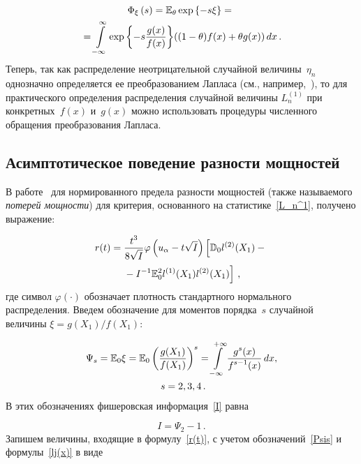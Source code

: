 \begin{multicols}{2}
\noindent
\begin{multline*}
\Phi_\xi\left(s\right)=\mathbb E_\theta
\exp{\left\{-s\xi\right\}}={}\\
{}=\int\limits_{-\infty}^\infty\exp{\left\{-s\displaystyle\frac{\displaystyle g(x)\mathstrut}{\displaystyle f(x)\mathstrut}\right\}}((1-\theta)
f(x)+\theta  g(x))\,dx\,.
\end{multline*}
Теперь, так как распределение неотрицательной случайной величины~$\eta_n$ 
однозначно определяется ее преобразованием Лапласа (см.,
например,~\cite{Feller2010}), то для практического определения
распределения случайной величины $L_n^{(1)}$ при конкретных~$f(x)$ и~$g(x)$ 
мож\-но использовать процедуры численного обращения
преобразования Лапласа.

\subsection{Асимптотическое поведение разности мощностей}

В работе~\cite{Bening2000} для нормированного предела раз\-ности
мощностей (также называемого \textit{потерей мощ\-ности}) для критерия,
основанного на статистике~\eqref{L_n^1}, получено выражение:

\noindent
\begin{multline}
\label{r(t)}
r(t)=\displaystyle\frac{\displaystyle t^3\mathstrut}{\displaystyle 8\sqrt{I}\mathstrut}\varphi\left(u_\alpha-t\sqrt{I}\right)\left[\mathbb D_0
l^{(2)}(X_1)-{}\right.\\
\left.{}-I^{-1}\mathbb E_0^2l^{(1)}(X_1)l^{(2)}(X_1)\right]\,,
\end{multline}
где символ $\varphi(\cdot)$ обозначает плотность стандартного
нормального распределения. Введем обозначение для моментов порядка~$s$ 
случайной величины $\xi={{g(X_1)}/{f(X_1)}}$:

\noindent
\begin{multline}
\label{Psis}
\Psi_s=\mathbb E_0\xi=\mathbb E_0\left(\displaystyle\frac{\displaystyle g(X_1)\mathstrut}{\displaystyle f(X_1)\mathstrut}\right)^s=
\int\limits_{-\infty}^{+\infty}\displaystyle\frac{\displaystyle g^s(x)\mathstrut}{\displaystyle f^{s-1}(x)\mathstrut}\,dx,
\\ \ s=2,3,4\,.
\end{multline}
В этих обозначениях фишеровская информация~\eqref{I} равна

\noindent
\begin{equation}
\label{PsiI}
I=\Psi_2-1\,.
\end{equation}
Запишем величины, входящие в формулу~\eqref{r(t)}, с учетом
обозначений~\eqref{Psis} и формулы~\eqref{lj(x)} в виде


\end{multicols}
